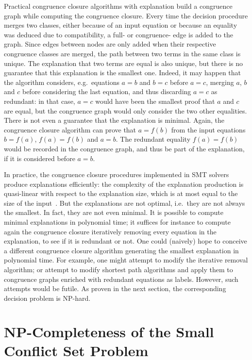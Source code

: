 \documentclass[smallextended]{svjour3}
\begin{document}
Practical congruence closure algorithms with explanation build a congruence
graph while computing the congruence closure.  Every time the decision procedure
merges two classes, either because of an input equation or because an equality was deduced due to compatibility,
a full- or congruence- edge is added to the graph.  
Since edges between nodes are only added when their respective congruence classes are merged, 
the path between two terms in the same class is unique.  The
explanation that two terms are equal is also unique, but there is no guarantee
that this explanation is the smallest one.  Indeed, it may happen that the
algorithm considers, e.g.\ equations $a=b$ and $b=c$ before $a=c$, merging $a$,
$b$ and $c$ before considering the last equation, and thus discarding $a=c$ as
redundant: in that case, $a=c$ would have been the smallest proof that $a$ and
$c$ are equal, but the congruence graph would only consider the two other
equalities. 
There is not even a guarantee that the explanation is minimal.
Again, the congruence closure algorithm can prove that $a = f(b)$ from the input
equations $b = f(a)$, $f(a) = f(b)$ and $a = b$.
The redundant equality $f(a) = f(b)$
would be recorded in the congruence graph, and thus be part of the explanation, if it is considered before $a = b$.

In practice, the congruence closure procedures implemented in SMT solvers
produce explanations efficiently: the complexity of the explanation production
is quasi-linear with respect to the explanation size, which is at most equal to
the size of the input~\cite{Nieuwenhuis6}.  But the explanations are not optimal, i.e.\ they are not always the smallest. In fact, they are not even minimal. It is possible to compute minimal
explanations in polynomial time; it suffices for instance to compute again the
congruence closure iteratively removing every equation in the explanation, to
see if it is redundant or not. One could (naively) hope to conceive a different
congruence closure algorithm generating the smallest explanation in polynomial
time. For example, one might attempt to modify the iterative removal algorithm; or attempt to modify shortest path algorithms and apply them to congruence graphs enriched with redundant equations as labels. However, such attempts would be futile. As proven in the next section, the corresponding decision problem is NP-hard. 


\section{NP-Completeness of the Small Conflict Set Problem}
\label{sec:npcomplete}
\end{document}
